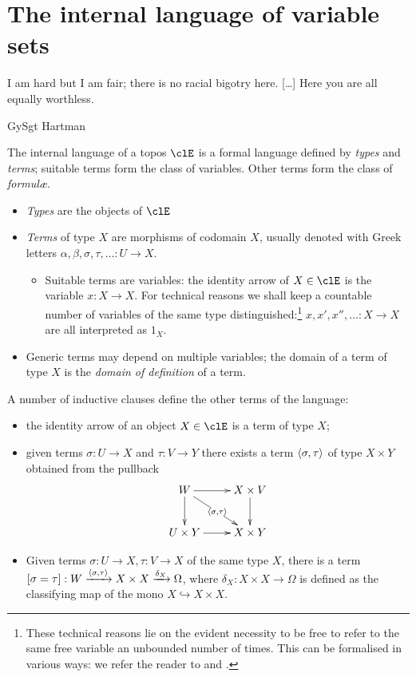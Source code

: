 \section{The internal language of variable sets}\label{int_lang}
\epigraph{I am hard but I am fair; there is no racial bigotry here. [\dots\unkern] Here you are all equally worthless.}{GySgt Hartman}
\begin{definition}\label{da_lang}
  The internal language of a topos $\clE$ is a formal language defined by \emph{types} and \emph{terms}; suitable terms form the class of variables. Other terms form the class of \emph{formul\ae}.
  \begin{itemize}
    \item \emph{Types} are the objects of $\clE$
    \item \emph{Terms} of type $X$ are morphisms of codomain $X$, usually denoted with Greek letters $\alpha,\beta,\sigma,\tau ,\ldots : U \to X$.
          \begin{itemize}
            \item Suitable terms are variables: the identity arrow of $X\in\clE$ is the variable  $x : X \to X$. For technical reasons we shall keep a countable number of variables of the same type distinguished:\footnote{These technical reasons lie on the evident necessity to be free to refer to the same free variable an unbounded number of times. This can be formalised in various ways: we refer the reader to \cite{lambek1988introduction} and \cite{JohnstonePT}.} $x,x',x'',\ldots : X \to X$ are all interpreted as $1_X$.
          \end{itemize}
    \item Generic terms may depend on multiple variables; the domain of a term of type $X$ is the \emph{domain of definition} of a term.
  \end{itemize}
  A number of inductive clauses define the other terms of the language:
  \begin{itemize}
    \item the identity arrow of an object $X\in\clE$ is a term of type $X$;
    \item given terms $\sigma : U \to X$ and $\tau :  V\to Y$ there exists a term $\langle \sigma,\tau\rangle$ of type $X\times Y$ obtained from the pullback
          \[\xymatrix{
            W \ar[d]\ar[r]\ar[dr]|{\lr{\sigma}{\tau}} & X \times V \ar[d]\\
            U\times Y \ar[r]& X\times Y
            }\]
    \item Given terms $\sigma : U \to X, \tau : V \to X$ of the same type $X$, there is a term $[\sigma = \tau] : W \xrightarrow{\langle \sigma,\tau\rangle} X\times X \xrightarrow{\delta_X} \Omega$, where $\delta_X : X\times X \to \Omega$ is defined as the classifying map of the mono $X \hookrightarrow X\times X$.

\end{itemize}
\end{definition}
